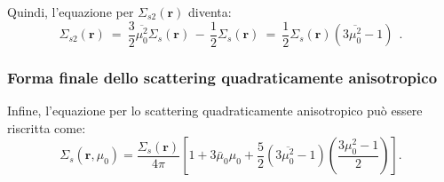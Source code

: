 Quindi, l'equazione per $\Sigma_{s2}(\mathbf{r})$ diventa:
\begin{equation}
	\Sigma_{s2}(\mathbf{r})\ =\ \frac{3}{2} \overline{\mu_0^2} \Sigma_s(\mathbf{r})\, -\, \frac{1}{2} \Sigma_s(\mathbf{r})\ =\ \frac{1}{2} \Sigma_s(\mathbf{r}) \left(3 \overline{\mu_0^2} - 1\right)\ \ .
\end{equation}


\subsubsection{Forma finale dello scattering quadraticamente anisotropico}
Infine, l'equazione per lo scattering quadraticamente anisotropico può essere riscritta come:
\begin{equation}
	\Sigma_s(\mathbf{r}, \mu_0) = \frac{\Sigma_s(\mathbf{r})}{4\pi} \left[ 1 + 3 \bar{\mu}_0 \mu_0 + \frac{5}{2} \left(3 \overline{\mu_0^2} - 1\right) \left(\frac{3\mu_0^2 - 1}{2}\right) \right].
\end{equation}